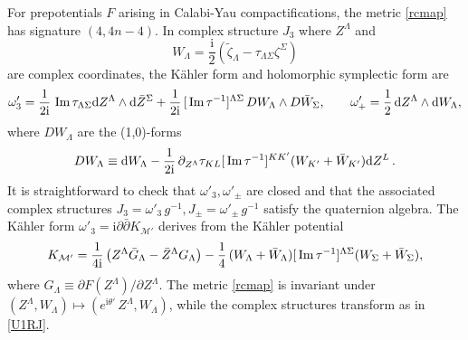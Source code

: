 \documentclass[12pt,reqno]{article}
\numberwithin{equation}{section}
\renewcommand{\Im}{\imag}
\DeclareMathOperator{\imag}{Im}
\newcommand{\be}{\begin{equation}}
\newcommand{\ee}{\end{equation}}
\def\Im{\,{\rm Im}\, }
\def\({\left(}
\def\){\right)}
\def\p{\partial}
\def\hf{\frac{1}{2}}
\def\bZ{\bar Z}
\def\bW{ \bar W}
\def\bG{\bar G}
\newcommand{\de}{\mathrm{d}}
\newcommand{\I}{\mathrm{i}}
\newcommand{\cM}{\mathcal{M}}
\def\pa{\partial}
\newcommand{\tzeta}{{\tilde\zeta}}
\newcommand{\kahler}{{K\"ahler}\xspace}
\def\phip{{\theta'}}
\def\pcM{\cM'}
\def\pomega{\omega'}
\def\rigZ{Z}
\def\brigZ{\bZ}
\numberwithin{equation}{section}
\begin{document}
For prepotentials $F$ arising in Calabi-Yau compactifications, the metric \eqref{rcmap}
has signature $(4,4n-4)$.
In complex structure $J_3$ where  $\rigZ^\Lambda$ and
\be
W_\Lambda=\frac{\I}{2}(\tzeta_\Lambda-\tau_{\Lambda\Sigma}\zeta^{\Sigma})
\ee
are complex coordinates, the \kahler form and holomorphic symplectic form
are
\be
\label{omKCrcmap}
\pomega_3 = \frac{1}{2\I}\, \Im\tau_{\Lambda\Sigma} \de \rigZ^\Lambda \wedge \de \brigZ^\Sigma
+\frac{1}{2\I}\, [\Im\tau^{-1}]^{\Lambda \Sigma} \, DW_\Lambda \wedge D \bar W_\Sigma ,
\qquad
\pomega_+ = \hf\, \de \rigZ^\Lambda\wedge \de W_\Lambda  ,
\ee
where $DW_\Lambda$ are the (1,0)-forms
\be
DW_\Lambda \equiv
\de W_\Lambda - \frac{1}{2\I}\,\p_{Z^\Lambda}\tau_{KL} [\Im\tau^{-1}]^{KK'}
(W_{K'}+\bar W_{K'}) \de \rigZ^L \, .
\ee
It is straightforward to check that $\pomega_3,\pomega_\pm$ are closed and
that the associated complex structures $J_3=\pomega_3\, g^{-1}, J_\pm=\pomega_\pm\, g^{-1}$
satisfy the quaternion algebra.
The \kahler form $\pomega_3=\I\pa\bar\pa K_{\pcM} $ derives from the
\kahler potential
\be
\label{kcecotti}
K_{\pcM} = \frac{1}{4\I} \( \rigZ^\Lambda \bG_\Lambda- \brigZ^\Lambda G_\Lambda \)
- \frac{1}{4}\,(W_\Lambda + \bW_\Lambda) [\Im\tau^{-1}]^{\Lambda\Sigma}
(W_\Sigma + \bW_\Sigma) ,
\ee
where $G_\Lambda\equiv \pa F(\rigZ^\Lambda)/\pa \rigZ^\Lambda$.
The metric \eqref{rcmap} is invariant under $(\rigZ^\Lambda,W_\Lambda)\mapsto
 (e^{\I\phip}\, \rigZ^\Lambda,W_\Lambda)$, while the complex structures transform as in \eqref{U1RJ}.
\end{document}
